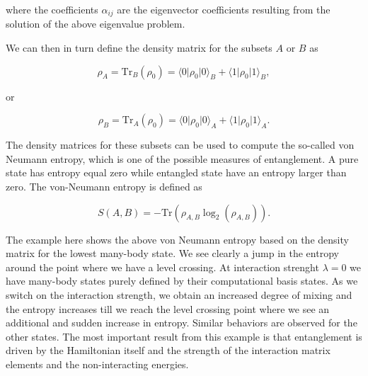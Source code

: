 \documentclass[%
oneside,                 %
final,                   %
10pt]{article}
\begin{document}
where the coefficients $\alpha_{ij}$ are the eigenvector coefficients
resulting from the solution of the above eigenvalue problem. 

We can
then in turn define the density matrix for the subsets $A$ or $B$ as

\[
\rho_A=\mathrm{Tr}_B(\rho_{0})=\langle 0 \vert \rho_{0} \vert 0\rangle_{B}+\langle 1 \vert \rho_{0} \vert 1\rangle_{B},
\]

or

\[
\rho_B=\mathrm{Tr}_A(\rho_0)=\langle 0 \vert \rho_{0} \vert 0\rangle_{A}+\langle 1 \vert \rho_{0} \vert 1\rangle_{A}.
\]

The density matrices for these subsets can be used to compute the
so-called von Neumann entropy, which is one of the possible measures
of entanglement. A pure state has entropy equal zero while entangled
state have an entropy larger than zero. The von-Neumann entropy is
defined as

\[
S(A,B)=-\mathrm{Tr}\left(\rho_{A,B}\log_2 (\rho_{A,B})\right).
\]

The example here shows the above von Neumann entropy based on the
density matrix for the lowest many-body state. We see clearly a jump
in the entropy around the point where we have a level crossing. At
interaction strenght $\lambda=0$ we have many-body states purely
defined by their computational basis states. As we switch on the
interaction strength, we obtain an increased degree of mixing and the
entropy increases till we reach the level crossing point where we see
an additional and sudden increase in entropy. Similar behaviors are
observed for the other states. The most important result from this
example is that entanglement is driven by the Hamiltonian itself and
the strength of the interaction matrix elements and the
non-interacting energies.
\end{document}
